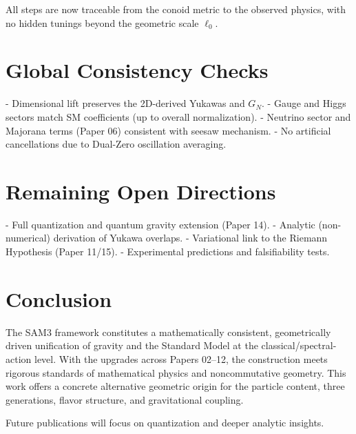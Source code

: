 \documentclass[11pt,a4paper]{article}
\begin{document}
All steps are now traceable from the conoid metric to the observed physics, with no hidden tunings beyond the geometric scale \(\ell_0\).

\section{Global Consistency Checks}

- Dimensional lift preserves the 2D-derived Yukawas and \(G_N\).
- Gauge and Higgs sectors match SM coefficients (up to overall normalization).
- Neutrino sector and Majorana terms (Paper 06) consistent with seesaw mechanism.
- No artificial cancellations due to Dual-Zero oscillation averaging.

\section{Remaining Open Directions}

- Full quantization and quantum gravity extension (Paper 14).
- Analytic (non-numerical) derivation of Yukawa overlaps.
- Variational link to the Riemann Hypothesis (Paper 11/15).
- Experimental predictions and falsifiability tests.

\section{Conclusion}

The SAM3 framework constitutes a mathematically consistent, geometrically driven unification of gravity and the Standard Model at the classical/spectral-action level. With the upgrades across Papers 02--12, the construction meets rigorous standards of mathematical physics and noncommutative geometry. This work offers a concrete alternative geometric origin for the particle content, three generations, flavor structure, and gravitational coupling.

Future publications will focus on quantization and deeper analytic insights.



\end{document}
